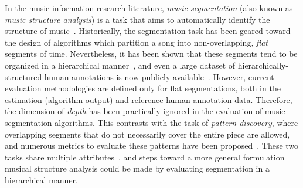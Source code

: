 \documentclass{article}
\begin{document}
In the music information research literature, \emph{music segmentation} (also known as \emph{music structure analysis}) is a task that aims to automatically identify the structure of music~\cite{Paulus2010}.
Historically, the segmentation task has been geared toward the design of algorithms which partition a song into non-overlapping, \emph{flat} segments of time.
Nevertheless, it has been shown that these segments tend to be organized in a hierarchical manner~\cite{Peeters2009}, and even a large dataset of hierarchically-structured human annotations is now publicly available~\cite{Smith2011}.
However, current evaluation methodologies are defined only for flat segmentations, both in the estimation (algorithm output) and reference human annotation data.
Therefore, the dimension of \emph{depth} has been practically ignored in the evaluation of music segmentation algorithms.
This contrasts with the task of \emph{pattern discovery}, where overlapping segments that do not necessarily cover the entire piece are allowed, and numerous metrics to evaluate these patterns have been proposed~\cite{Collins2013}.
These two tasks share multiple attributes~\cite{Nieto2014_Motives}, and steps toward a more general formulation musical structure analysis could be made by evaluating segmentation in 
a hierarchical manner.

\end{document}

